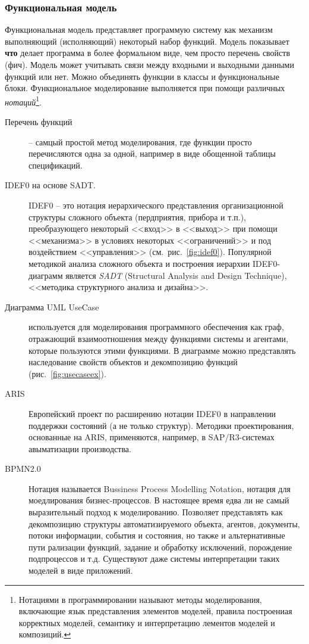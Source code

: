 \documentclass[a4paper,14pt,final]{extreport}
\begin{document}
\subsubsection{Функциональная модель}
\label{sec:funmod}

Функциональная модель представляет программую систему как механизм выполняющий (исполняющий) некоторый набор функций.  Модель показывает \textbf{что} делает программа в более формальном виде, чем просто перечень свойств (фич).   Модель может учитывать связи между входными и выходными данными функций или нет.  Можно объединять функции в классы и функциональные блоки.  Функциональное моделирование выполняется при помощи различных \emph{нотаций}\footnote{Нотациями в программировании называют методы моделирования, включающие язык представления элементов моделей, правила построениая корректных моделей, семантику и интерпретацию лементов моделей и композиций.}.

\begin{description}
\item[Перечень функций] -- самцый простой метод моделирования, где функции просто перечисляются одна за одной, например в виде обощенной таблицы спецификаций.
\item[IDEF0 на основе SADT.]  IDEF0 -- это нотация иерархического представления организационной структуры сложного объекта (пердприятия, прибора и т.п.), преобразующего некоторый <<вход>> в <<выход>> при помощи <<механизма>> в условиях некоторых <<ограничений>> и под воздействием <<управления>> (см.~рис.~\ref{fig:idef0}).  Популярной методикой анализа сложного объекта и построения иерархии IDEF0-диаграмм является \emph{SADT} (Structural Analysis and Design Technique), <<методика структурного анализа и дизайна>>.
\item[Диаграмма UML UseCase] используется для моделирования программного обеспечения как граф, отражающий взаимоотношения между функциями системы и агентами, которые пользуются этими функциями.  В диаграмме можно представлять наследование свойств объектов и декомпозицию функций (рис.~\ref{fig:usecaseex}).
\item[ARIS] Европейский проект по расширению нотации IDEF0 в направлении поддержки состояний (а не только структур).  Методики проектирования, основанные на ARIS, применяются, например, в SAP/R3-системах авыматизации производства.
\item[BPMN2.0] Нотация называется Bussiness Process Modelling Notation, нотация для моедлирования бизнес-процессов.  В настоящее время едва ли не самый выразительный подход к моделированию.  Позволяет представлять как декомпозицию структуры автоматизируемого объекта, агентов, документы, потоки информации, события и состояния, но также и альтернативные пути рализации функций, задание и обработку исключений, порождение подпроцессов и т.д.  Существуют даже системы интерпретации таких моделей в виде приложений.
\end{description}
\end{document}
